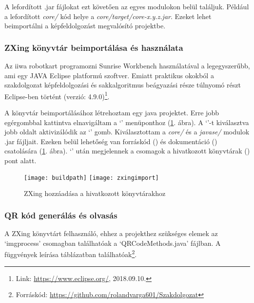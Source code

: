\documentclass[../documentation.tex]{subfiles}
\begin{document}
A lefordított .jar fájlokat ezt követően az egyes modulokon belül találjuk. Például a lefordított \textit{core/} kód helye a \textit{core/target/core-x.y.z.jar}. Ezeket lehet beimportálni a képfeldolgozást megvalósító projektbe.

\subsubsection{ZXing könyvtár beimportálása és használata}
Az iiwa robotkart programozni Sunrise Workbench használatával a legegyszerűbb, ami egy JAVA Eclipse platformú szoftver. Emiatt praktikus okokból a szakdolgozat képfeldolgozási és sakkalgoritmus beágyazási része túlnyomó részt Eclipse-ben történt (verzió: 4.9.0)\footnote{Link: \url{https://www.eclipse.org/}, 2018.09.10.}.

A könyvtár beimportálásához létrehoztam egy java projektet. Erre jobb egérgombbal kattintva elnavigáltam a `' menüponthoz (\ref{fig:zxingimport}. ábra). A `'-t kiválasztva jobb oldalt aktivizálódik az `' gomb. Kiválasztottam a \textit{core/} és a \textit{javase/} modulok .jar fájljait. Ezeken belül lehetőség van forráskód () és dokumentáció () csatolására (\ref{fig:zxingimport}. ábra). `' után megjelennek a csomagok a hivatkozott könyvtárak () pont alatt.

\begin{figure}[h]
\centering
\texttt{[image: buildpath]}
\texttt{[image: zxingimport]}
\caption{ZXing hozzáadása a hivatkozott könyvtárakhoz}
\label{fig:zxingimport}
\end{figure}

\subsubsection{QR kód generálás és olvasás}
A ZXing könyvtárt felhasználó, ehhez a projekthez szükséges elemek az `imgprocess' csomagban találhatóak a `QRCodeMethods.java' fájlban. A függvények leírása   táblázatban találhatóak\footnote{Forráskód: \url{https://github.com/rolandvarga601/Szakdolgozat}}. 
\end{document}
